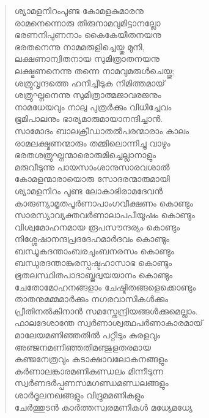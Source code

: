 \begin{verse}
ശ്യാമളനിറംപൂണ്ട കോമളകുമാരനു\\
രാമനെന്നൊരു തിരുനാമവുമിട്ടാനല്ലോ\\
ഭരണനിപുണനാം കൈകേയീതനയനു\\
ഭരതനെന്നു നാമമരുളിച്ചെയ്തു മുനി,\\
ലക്ഷണാന്വിതനായ സുമിത്രാതനയനു\\
ലക്ഷ്മണനെന്നു തന്നെ നാമവുമരുള്‍ചെയ്തു;\\
ശത്രുവൃന്ദത്തെ ഹനിച്ചീടുക നിമിത്തമായ്\\
ശത്രുഘ്നനെന്നു സുമിത്രാത്മജാവരജനും\\
നാമധേയവും നാലു പുത്രര്‍ക്കും വിധിച്ചേവം\\
ഭൂമിപാലനും ഭാര്യമാരുമായാനന്ദിച്ചാന്‍.\\
സാമോദം ബാലക്രീഡാതല്‍പരന്മാരാം കാലം\\
രാമലക്ഷ്മണന്മാരും തമ്മിലൊന്നിച്ചു വാഴും\\
ഭരതശത്രുഘ്നന്മാരൊരുമിച്ചെല്ലാനാളും\\
മരുവീടുന്നു പായസാംശാനുസാരവശാല്‍\\
കോമളന്മാരായൊരു സോദരന്മാരുമായി\\
ശ്യാമളനിറം പൂണ്ട ലോകാഭിരാമദേവന്‍\\
കാരുണ്യാമൃതപൂര്‍ണാപാംഗവീക്ഷണം കൊണ്ടും\\
സാരസ്യാവ്യക്തവര്‍ണാലാപപീയൂഷം കൊണ്ടും\\
വിശ്വമോഹനമായ രൂപസൗന്ദര്യം കൊണ്ടും\\
നിശ്ശേഷാനന്ദപ്രദദേഹമാര്‍ദവം കൊണ്ടും\\
ബന്ധൂകദന്താംബരചുംബനരസം കൊണ്ടും\\
ബന്ധുരദന്താങ്കുരസ്പഷ്ടഹാസാഭ കൊണ്ടും\\
ഭൂതലസ്ഥിതപാദാബ്ജദ്വയയാനം കൊണ്ടും\\
ചേതോമോഹനങ്ങളാം ചേഷ്ടിതങ്ങളെക്കൊണ്ടും\\
താതനുമമ്മമാര്‍ക്കും നഗരവാസികള്‍ക്കും\\
പ്രീതിനല്‍കിനാന്‍ സമസ്തേന്ദ്രിയങ്ങള്‍ക്കുമെല്ലാം.\\
ഫാലദേശാന്തേ സ്വര്‍ണാശ്വത്ഥപര്‍ണാകാരമായ്\\
മാലേയമണിഞ്ഞതില്‍ പറ്റീടും കുരളവും\\
അഞ്ജനമണിഞ്ഞതിമഞ്ജുളതരമായ\\
കഞ്ജനേത്രവും കടാക്ഷാവലോകനങ്ങളും\\
കര്‍ണാലങ്കാരമണികുണ്ഡലം മിന്നീടുന്ന\\
സ്വര്‍ണദര്‍പ്പണസമഗണ്ഡമണ്ഡലങ്ങളും\\
ശാര്‍ദൂലനഖങ്ങളും വിദ്രുമമണികളും\\
ചേര്‍ത്തുടന്‍ കാര്‍ത്തസ്വരമണികള്‍ മധ്യേമധ്യേ\\

\end{verse}
